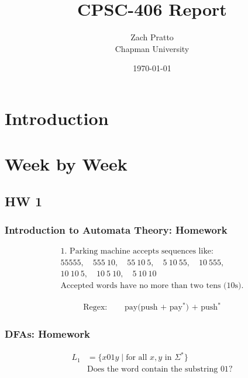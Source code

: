 \documentclass{article}
\title{CPSC-406 Report}
\author{Zach Pratto  \\ Chapman University}
\date{\today}
\theoremstyle{theorem}
\theoremstyle{definition}
\theoremstyle{remark}
\begin{document}
\maketitle

\begin{abstract}
\end{abstract}

\setcounter{tocdepth}{3}
\tableofcontents

\section{Introduction}\label{intro}

\section{Week by Week}\label{homework}

\subsection{HW 1}

\subsubsection{Introduction to Automata Theory: Homework}

\begin{multline*}
\text{1. Parking machine accepts sequences like:} \\
55555,\quad 555\ 10,\quad 55\ 10\ 5,\quad 5\ 10\ 55,\quad 10\ 555, \\
10\ 10\ 5,\quad 10\ 5\ 10,\quad 5\ 10\ 10 \\
\text{Accepted words have no more than two tens (10s).}
\end{multline*}

\begin{align*}
\text{Regex: } \quad & \text{pay(push + pay$^*$) + push$^*$}
\end{align*}


\subsubsection{DFAs: Homework}

\begin{align*}
L_1 &= \{ x01y \mid \text{for all } x, y \text{ in } \Sigma^* \} \\
    &\text{Does the word contain the substring } 01?
\end{align*}
\end{document}
